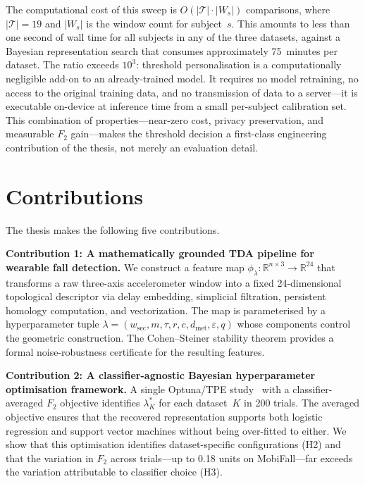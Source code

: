 \documentclass[onluarkali,ingilizce,yukseklisans,karton,LisansustuEgitim]{itutez}
\providecommand{\R}{\mathbb{R}}
\providecommand{\1}{\mathbf{1}}
\begin{document}
The computational cost of this sweep is $O(|\mathcal{T}|\cdot|W_s|)$ comparisons,
where $|\mathcal{T}|=19$ and $|W_s|$ is the window count for subject~$s$.  This
amounts to less than one second of wall time for all subjects in any of the three
datasets, against a Bayesian representation search that consumes approximately
75~minutes per dataset.  The ratio exceeds $10^3$: threshold personalisation is a
computationally negligible add-on to an already-trained model.  It requires no model
retraining, no access to the original training data, and no transmission of data to
a server---it is executable on-device at inference time from a small per-subject
calibration set.  This combination of properties---near-zero cost, privacy
preservation, and measurable $F_2$ gain---makes the threshold decision a first-class
engineering contribution of the thesis, not merely an evaluation detail.

\section{Contributions}
\label{subsec:contributions}

The thesis makes the following five contributions.

\textbf{Contribution 1: A mathematically grounded TDA pipeline for wearable fall
detection.}  We construct a feature map $\phi_\lambda\colon\R^{n\times 3}\to\R^{24}$
that transforms a raw three-axis accelerometer window into a fixed 24-dimensional
topological descriptor via delay embedding, simplicial filtration, persistent homology
computation, and vectorization.  The map is parameterised by a hyperparameter tuple
$\lambda=(w_\mathrm{sec},m,\tau,r,c,d_\mathrm{met},\varepsilon,q)$ whose components
control the geometric construction.  The Cohen--Steiner stability theorem provides a
formal noise-robustness certificate for the resulting features.

\textbf{Contribution 2: A classifier-agnostic Bayesian hyperparameter optimisation
framework.}  A single Optuna/TPE study~\parencite{optuna} with a classifier-averaged
$F_2$ objective identifies $\lambda^*_K$ for each dataset~$K$ in 200 trials.  The
averaged objective ensures that the recovered representation supports both logistic
regression and support vector machines without being over-fitted to either.  We show
that this optimisation identifies dataset-specific configurations (H2) and that the
variation in $F_2$ across trials---up to 0.18 units on MobiFall---far exceeds the
variation attributable to classifier choice (H3).
\end{document}
